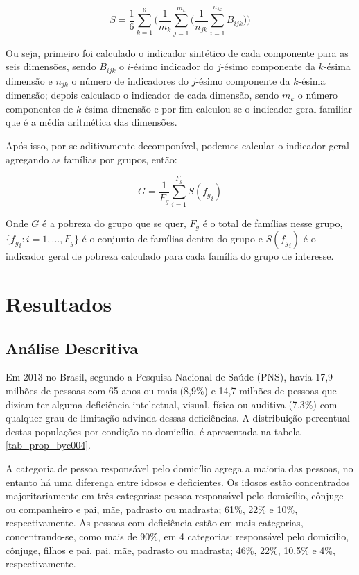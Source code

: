 \documentclass[
	12pt,				%
	openright,			%
	twoside,			%
	a4paper,			%
	english,			%
	french,				%
	spanish,			%
	brazil				%
	]{abntex2}
\begin{document}
 \begin{equation}
 	S=\frac{1}{6} \sum_{k=1}^{6} \bigg( \frac{1}{m_k}\sum_{j=1}^{m_k} \bigg( \frac{1}{n_{jk}} \sum_{i=1}^{n_{jk}} B_{ijk} \bigg) \bigg)
 \end{equation}

Ou seja, primeiro foi calculado o indicador sintético de cada componente para as seis dimensões, sendo $ B_{ijk} $ o $i$-ésimo indicador do $j$-ésimo componente da $k$-ésima dimensão e $ n_{jk} $ o número de indicadores do $j$-ésimo componente da $k$-ésima dimensão; depois calculado o indicador de cada dimensão, sendo $m_k$ o número componentes de  $k$-ésima dimensão e por fim calculou-se o indicador geral familiar que é a média aritmética das dimensões. 

Após isso, por se aditivamente decomponível, podemos calcular o indicador geral agregando as famílias por grupos, então:

\begin{equation}
	G=\frac{1}{F_g} \sum_{i=1}^{F_g} S({f_g}_i)
\end{equation}

Onde $ G $ é a pobreza do grupo que se quer, $ F_g $ é o total de famílias nesse grupo, $ \{{f_g}_i: i=1,...,F_g \} $ é o conjunto de famílias dentro do grupo e $ S({f_g}_i) $ é o indicador geral de pobreza calculado para cada família do grupo de interesse. 

\chapter{Resultados}
\section{Análise Descritiva}
Em 2013 no Brasil, segundo a Pesquisa Nacional de Saúde (PNS), havia 17,9 milhões de pessoas com 65 anos ou mais (8,9\%) e 14,7 milhões de pessoas que diziam ter alguma deficiência intelectual, visual, física ou auditiva (7,3\%) com qualquer grau de limitação advinda dessas deficiências. A distribuição percentual destas populações por condição no domicílio, é apresentada na tabela \ref*{tab_prop_byc004}.

A categoria de pessoa responsável pelo domicílio agrega a maioria das pessoas, no entanto há uma diferença entre idosos e deficientes. Os idosos estão concentrados majoritariamente em três categorias: pessoa responsável pelo domicílio, cônjuge ou companheiro e pai, mãe, padrasto ou madrasta; 61\%, 22\% e 10\%, respectivamente. As pessoas com deficiência estão em mais categorias, concentrando-se, como mais de 90\%, em 4 categorias: responsável pelo domicílio, cônjuge, filhos e pai, pai, mãe, padrasto ou madrasta; 46\%, 22\%, 10,5\% e 4\%, respectivamente.
\end{document}

